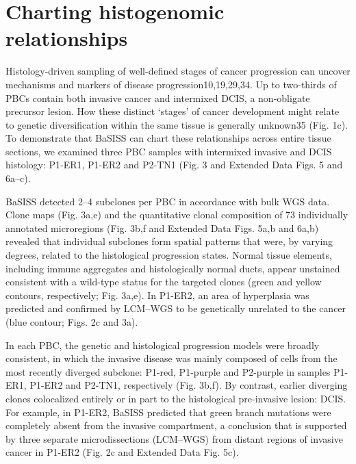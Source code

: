 \section{Charting histogenomic relationships}

Histology-driven sampling of well-defined stages of cancer progression can uncover mechanisms and markers of disease progression10,19,29,34. Up to two-thirds of PBCs contain both invasive cancer and intermixed DCIS, a non-obligate precursor lesion. How these distinct ‘stages’ of cancer development might relate to genetic diversification within the same tissue is generally unknown35 (Fig. 1c). To demonstrate that BaSISS can chart these relationships across entire tissue sections, we examined three PBC samples with intermixed invasive and DCIS histology: P1-ER1, P1-ER2 and P2-TN1 (Fig. 3 and Extended Data Figs. 5 and 6a–c).

BaSISS detected 2–4 subclones per PBC in accordance with bulk WGS data. Clone maps (Fig. 3a,e) and the quantitative clonal composition of 73 individually annotated microregions (Fig. 3b,f and Extended Data Figs. 5a,b and 6a,b) revealed that individual subclones form spatial patterns that were, by varying degrees, related to the histological progression states. Normal tissue elements, including immune aggregates and histologically normal ducts, appear unstained consistent with a wild-type status for the targeted clones (green and yellow contours, respectively; Fig. 3a,e). In P1-ER2, an area of hyperplasia was predicted and confirmed by LCM–WGS to be genetically unrelated to the cancer (blue contour; Figs. 2c and 3a).

In each PBC, the genetic and histological progression models were broadly consistent, in which the invasive disease was mainly composed of cells from the most recently diverged subclone: P1-red, P1-purple and P2-purple in samples P1-ER1, P1-ER2 and P2-TN1, respectively (Fig. 3b,f). By contrast, earlier diverging clones colocalized entirely or in part to the histological pre-invasive lesion: DCIS. For example, in P1-ER2, BaSISS predicted that green branch mutations were completely absent from the invasive compartment, a conclusion that is supported by three separate microdissections (LCM–WGS) from distant regions of invasive cancer in P1-ER2 (Fig. 2c and Extended Data Fig. 5c).

